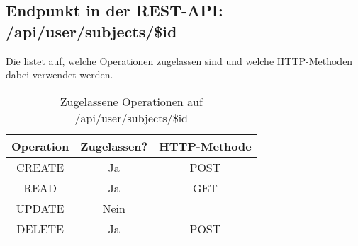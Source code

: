 \subsection{Endpunkt in der REST-API: /api/user/subjects/\$id}
Die  listet auf, welche Operationen zugelassen sind und welche HTTP-Methoden dabei verwendet werden. 

\begin{table}[!htbp]
	\begin{tabular}{|c|c|c|}
		\hline
			\textbf{Operation} & \textbf{Zugelassen?} & \textbf{HTTP-Methode} \\ \hline
			CREATE & Ja & POST \\ \hline 
			READ & Ja & GET \\ \hline
			UPDATE & Nein & \\ \hline 
			DELETE & Ja & POST \\ \hline
	\end{tabular}

		\caption{Zugelassene Operationen auf /api/user/subjects/\$id}
		\label{tab:end:rest:api:user:subjects:id:meth}
\end{table}